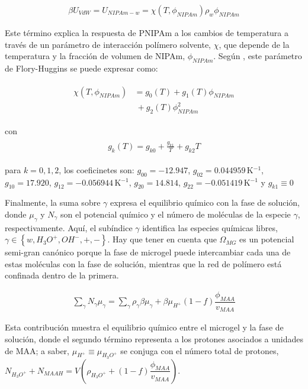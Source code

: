 \begin{align}
	\beta U_{VdW} = U_{NIPAm-w} = \chi (T, \phi_{NIPAm})\rho_w \phi_{NIPAm}
\end{align}


Este  t\'ermino explica la respuesta de PNIPAm a los cambios de temperatura a trav\'es de un par\'ametro de interacci\'on pol\'imero solvente, $\chi$, que depende de la temperatura y la fracci\'on de volumen de NIPAm, $\phi_{NIPAm}$.
Seg\'un  \citet{afroze2000}, este par\'ametro de Flory-Huggins se puede expresar como:
%
%


\begin{align}
	\begin{aligned}
		\chi (T, \phi_{NIPAm}) &=g_0(T) +g_1(T)\phi_{NIPAm} \\
		&~+ g_2(T)\phi_{NIPAm}^2
	\end{aligned}
\end{align}

\noindent con
%
%
\begin{align}
	\begin{aligned} 
		g_k(T)=g_{k0} + \frac{g_{k1}}{T} + g_{k2}T
	\end{aligned}
\end{align}


\noindent para  $k=0,1,2$, los coeficinetes son: $g_{00}= -12.947$, $g_{02}=0.044959\,$K$^{-1}$, $g_{10}= 17.920$, $g_{12}= -0.056944$\,K$^{-1}$, $g_{20}= 14.814$, $g_{22}= -0.051419$\,K$^{-1}$  y $g_{k1}\equiv 0$ \cite{afroze2000}




Finalmente, la suma sobre  $\gamma$ expresa el equilibrio qu\'imico con la fase de soluci\'on, donde $\mu_\gamma$ y $N_\gamma$ son el potencial qu\'imico y el n\'umero de mol\'eculas de la especie $\gamma$, respectivamente.
Aqu\'i, el subíndice $\gamma$ identifica  las especies qu\'imicas libres, $\gamma \in \left\{ w, H_3O^+, OH^-, +,- \right\}$.
Hay que tener en cuenta que $\Omega_{MG}$ es un potencial semi-gran can\'onico porque la fase de microgel puede intercambiar cada una de estas mol\'eculas con la fase de soluci\'on, mientras que la red de pol\'imero est\'a confinada dentro de la primera.


\begin{align}
	\sum_\gamma N_\gamma \mu_\gamma = \sum_{\gamma }{\rho_\gamma\beta\mu_\gamma}
	+ \beta\mu_{H^+}(1-f)\dfrac{\phi_{MAA}}{v_{MAA}}
\end{align}

Esta contribuci\'on muestra el equilibrio qu\'imico entre el microgel y la fase de soluci\'on, donde el segundo t\'ermino representa a los protones asociados a unidades de MAA;
a saber, $\mu_{H^+}\equiv\mu_{H_3O^+}$ se conjuga con el n\'umero total de protones,
$N_{H_3O^+}+N_{MAAH}=V\left(\rho_{H_3O^+}+(1-f)\dfrac{\phi_{MAA}}{v_{MAA}}\right)$.


